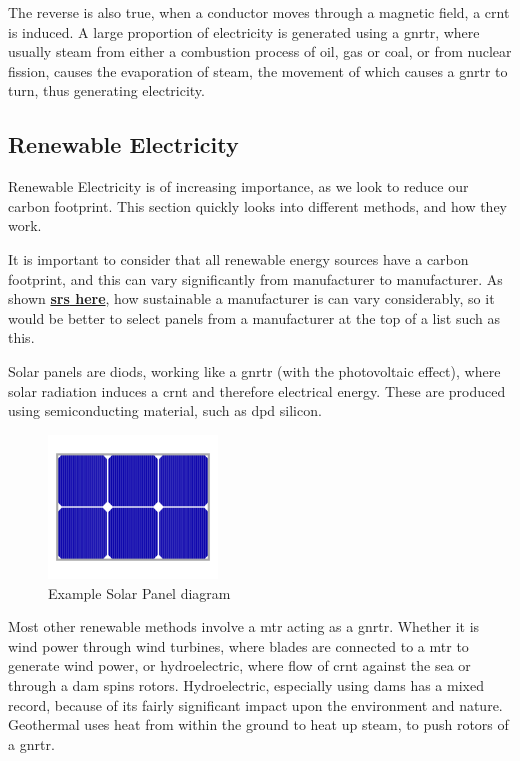 \documentclass[a4paper,11pt]{report}
\let\oldhref\href %
\renewcommand{\href}[2]{\oldhref{#1}{\bf\gls{srs} #2}}
\begin{document}
The reverse is also true, when a conductor moves through a magnetic field, a \gls{crnt} is induced. A large proportion of electricity is generated using a \gls{gnrtr}, where usually steam from either a combustion process of oil, gas or coal, or from nuclear fission, causes the evaporation of steam, the movement of which causes a \gls{gnrtr} to turn, thus generating electricity.

\vspace*{1\baselineskip}

\subsection{Renewable Electricity}

Renewable Electricity is of increasing importance, as we look to reduce our carbon footprint. This section quickly looks into different methods, and how they work.

It is important to consider that all renewable energy sources have a carbon footprint, and this can vary significantly from manufacturer to manufacturer. As shown \href{http://www.solars\gls{core}card.com/2018-19/2018-19-SVTC-Solar-S\gls{core}card.pdf}{here}, how sustainable a manufacturer is can vary considerably, so it would be better to select panels from a manufacturer at the top of a list such as this.

Solar panels are \gls{diod}s, working like a \gls{gnrtr} (with the photovoltaic effect), where solar radiation induces a \gls{crnt} and therefore electrical energy. These are produced using semiconducting material, such as \gls{dpd} silicon.

\begin{figure}[H]
\centering
\includegraphics[width=0.4\textwidth]{solarpanel}
\caption{Example Solar Panel diagram}
\end{figure}

Most other renewable methods involve a \gls{mtr} acting as a \gls{gnrtr}. Whether it is wind power through wind turbines, where blades are connected to a \gls{mtr} to generate wind power, or hydroelectric, where flow of \gls{crnt} against the sea or through a dam spins rotors. Hydroelectric, especially using dams has a mixed record, because of its fairly significant impact upon the environment and nature. Geothermal uses heat from within the ground to heat up steam, to push rotors of a \gls{gnrtr}.
\end{document}
